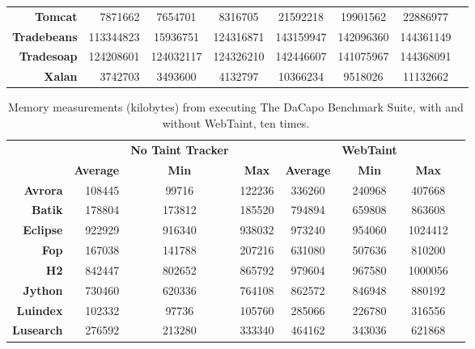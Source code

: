 \begin{sidewaystable}
\begin{tabular}{rrcccccc}
    \textbf{Tomcat}     & 7871662          & 7654701      & 8316705      & 21592218         & 19901562     & 22886977     \\
    \textbf{Tradebeans} & 113344823        & 15936751     & 124316871    & 143159947        & 142096360    & 144361149    \\
    \textbf{Tradesoap}  & 124208601        & 124032117    & 124326210    & 142446607        & 141075967    & 144368091    \\
    \textbf{Xalan}      & 3742703          & 3493600      & 4132797      & 10366234         & 9518026      & 11132662    
  \end{tabular}
\end{sidewaystable}

\begin{sidewaystable}
  \centering
  \caption{Memory measurements (kilobytes) from executing The DaCapo Benchmark Suite, with and without WebTaint, ten times.}
  \label{MemoryTable}
  \begin{tabular}{rrcccccc}
    & & \textbf{No Taint Tracker} & & & \textbf{WebTaint} & \\
    & \textbf{Average} & \textbf{Min} & \textbf{Max} & \textbf{Average} & \textbf{Min} & \textbf{Max} \\
    \textbf{Avrora}     & 108445           & 99716        & 122236       & 336260           & 240968       & 407668       \\
    \textbf{Batik}      & 178804           & 173812       & 185520       & 794894           & 659808       & 863608       \\
    \textbf{Eclipse}    & 922929           & 916340       & 938032       & 973240           & 954060       & 1024412      \\
    \textbf{Fop}        & 167038           & 141788       & 207216       & 631080           & 507636       & 810200       \\
    \textbf{H2}         & 842447           & 802652       & 865792       & 979604           & 967580       & 1000056      \\
    \textbf{Jython}     & 730460           & 620336       & 764108       & 862572           & 846948       & 880192       \\
    \textbf{Luindex}    & 102332           & 97736        & 105760       & 285066           & 226780       & 316556       \\
    \textbf{Lusearch}   & 276592           & 213280       & 333340       & 464162           & 343036       & 621868       \\

\end{tabular}
\end{sidewaystable}
